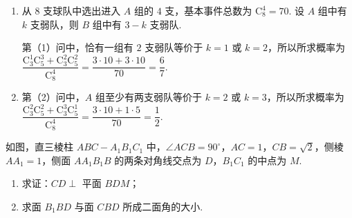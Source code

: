 \begin{solution}
\begin{enumerate}
\item
从 \(8\) 支球队中选出进入 \(A\) 组的 \(4\) 支，基本事件总数为 \(\mathrm C_8^4=70\). 设 \(A\) 组中有 \(k\) 支弱队，则 \(B\) 组中有 \(3-k\) 支弱队.

第（1）问中，恰有一组有 \(2\) 支弱队等价于 \(k=1\) 或 \(k=2\)，所以所求概率为 \(\dfrac{\mathrm C_3^1\mathrm C_5^3+\mathrm C_3^2\mathrm C_5^2}{\mathrm C_8^4}=\dfrac{3\cdot10+3\cdot10}{70}=\dfrac{6}{7}\).

\item
第（2）问中，\(A\) 组至少有两支弱队等价于 \(k=2\) 或 \(k=3\)，所以所求概率为 \(\dfrac{\mathrm C_3^2\mathrm C_5^2+\mathrm C_3^3\mathrm C_5^1}{\mathrm C_8^4}=\dfrac{3\cdot10+1\cdot5}{70}=\dfrac{1}{2}\).
\end{enumerate}
\end{solution}

\begin{problem}
如图，直三棱柱 \(ABC-A_1B_1C_1\) 中，\(\angle ACB=90^{\circ}\)，\(AC=1\)，\(CB=\sqrt2\)，侧棱 \(AA_1=1\)，侧面 \(AA_1B_1B\) 的两条对角线交点为 \(D\)，\(B_1C_1\) 的中点为 \(M\).

\begin{enumerate}
\item 求证：\(CD\perp\) 平面 \(BDM\)；
\item 求面 \(B_1BD\) 与面 \(CBD\) 所成二面角的大小.
\end{enumerate}

\end{problem}

